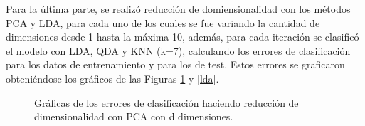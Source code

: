 \documentclass[letter, 10pt]{article}
\begin{document}
Para la última parte, se realizó reducción de domiensionalidad con los métodos PCA y LDA, para cada uno de los cuales se fue variando la cantidad de dimensiones desde 1 hasta la máxima 10, además, para cada iteración se clasificó el modelo con LDA, QDA y KNN (k=7), calculando los errores de clasificación para los datos de entrenamiento y para los de test. Estos errores se graficaron obteniéndose los gráficos de las Figuras \ref{pca} y \ref{lda}.\\

\begin{figure}[h!]
\begin{center}
\caption{Gráficas de los errores de clasificación haciendo reducción de dimensionalidad con PCA con d dimensiones.} 
\label{pca}
\end{center}
\end{figure}
\end{document}
